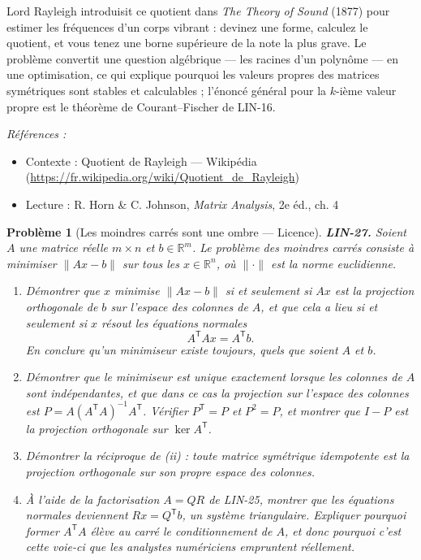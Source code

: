 \documentclass[11pt]{article}
\newtheorem{problem}{Problème}
\newenvironment{refs}{\par\small\noindent\emph{Références :}\begin{itemize}\setlength\itemsep{0pt}}{\end{itemize}\normalsize}
\begin{document}
\noindent Lord Rayleigh introduisit ce quotient dans \textit{The Theory of Sound} (1877)
pour estimer les fréquences d'un corps vibrant : devinez une forme, calculez le quotient, et vous
tenez une borne supérieure de la note la plus grave. Le problème convertit une question algébrique ---
les racines d'un polynôme --- en une optimisation, ce qui explique pourquoi les valeurs propres des
matrices symétriques sont stables et calculables ; l'énoncé général pour la $k$-ième valeur propre
est le théorème de Courant--Fischer de LIN-16.

\begin{refs}
\item Contexte : Quotient de Rayleigh --- Wikipédia (\url{https://fr.wikipedia.org/wiki/Quotient_de_Rayleigh})
\item Lecture : R. Horn \& C. Johnson, \textit{Matrix Analysis}, 2e éd., ch. 4
\end{refs}

\bigskip

\begin{problem}[{Les moindres carrés sont une ombre --- Licence}]
\textbf{LIN-27.} Soient $A$ une matrice réelle $m \times n$ et $b \in \mathbb{R}^m$. Le
problème des moindres carrés consiste à minimiser $\|Ax - b\|$ sur tous les $x \in \mathbb{R}^n$,
où $\|\cdot\|$ est la norme euclidienne.
\begin{enumerate}
\item[(i)] Démontrer que $x$ minimise $\|Ax - b\|$ si et seulement si $Ax$ est la projection orthogonale
de $b$ sur l'espace des colonnes de $A$, et que cela a lieu si et seulement si $x$ résout les
équations normales
\[ A^{\mathsf{T}} A x = A^{\mathsf{T}} b. \]
En conclure qu'un minimiseur existe toujours, quels que soient $A$ et $b$.
\item[(ii)] Démontrer que le minimiseur est unique exactement lorsque les colonnes de $A$ sont indépendantes,
et que dans ce cas la projection sur l'espace des colonnes est
$P = A (A^{\mathsf{T}} A)^{-1} A^{\mathsf{T}}$. Vérifier $P^{\mathsf{T}} = P$ et $P^2 = P$,
et montrer que $I - P$ est la projection orthogonale sur $\ker A^{\mathsf{T}}$.
\item[(iii)] Démontrer la réciproque de (ii) : toute matrice symétrique idempotente est la projection orthogonale
sur son propre espace des colonnes.
\item[(iv)] À l'aide de la factorisation $A = QR$ de LIN-25, montrer que les équations normales deviennent
$Rx = Q^{\mathsf{T}} b$, un système triangulaire. Expliquer pourquoi former $A^{\mathsf{T}} A$
élève au carré le conditionnement de $A$, et donc pourquoi c'est cette voie-ci que les analystes
numériciens empruntent réellement.
\end{enumerate}

\end{problem}
\end{document}
